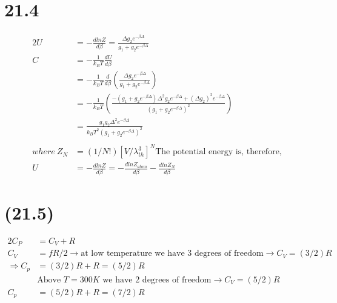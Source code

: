 \begin{latin}
    \section*{21.4}
    \begin{alignat*}{2}
        U &= -\frac{dlnZ}{d\beta} = \frac{\Delta g_2 e^{-\beta \Delta}}{g_1 + g_2e^{-\beta \Delta}}\\
        C &= -\frac{1}{k_B T}\frac{dU}{d\beta}\\
        &= -\frac{1}{k_B T}\frac{d}{d\beta}(\frac{\Delta g_2 e^{-\beta \Delta}}{g_1 + g_2e^{-\beta \Delta}})\\
        &= -\frac{1}{k_B T} (\frac{-(g_1 + g_2 e^{-\beta \Delta})\Delta^2 g_2 e^{-\beta \Delta} + (\Delta g_2)^2 e^{-\beta \Delta}}{(g_1 + g_2 e^{-\beta \Delta})^2})\\
        &= \frac{g_1 g_2 \Delta^2 e^{-\beta \Delta}}{k_B T^2 (g_1 + g_2 e^{-\beta \Delta})^2}\\\\
        where \ Z_N &= (1/N!)[V/\lambda_{th}^3]^N \text{The potential energy is, therefore,}\\
        U &= -\frac{d lnZ}{d\beta} = -\frac{d lnZ_{atom}}{d\beta}- \frac{dln Z_N}{d\beta} 
    \end{alignat*}

    \section*{(21.5)}
    \begin{alignat*}{2}
        C_P &= C_V +R\\
        C_V &= fR/2 \to \text{at low temperature we have 3 degrees of freedom} \to C_V = (3/2)R\\
        \Longrightarrow C_p&= (3/2)R + R= (5/2)R\\
        &\text{Above $T= 300K$ we have 2 degrees of freedom} \to C_V = (5/2)R\\
        C_p&= (5/2)R + R= (7/2)R
    \end{alignat*}
\end{latin}
